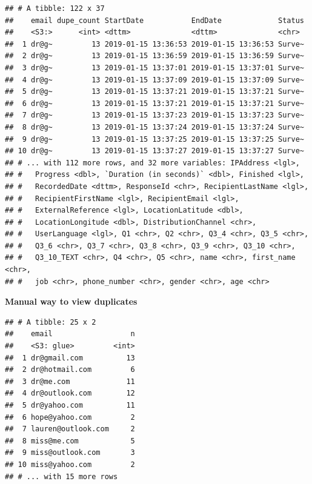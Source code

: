 \documentclass[]{book}
\newenvironment{Shaded}{\begin{snugshade}}{\end{snugshade}}
\newcommand{\CommentTok}[1]{\textcolor[rgb]{0.56,0.35,0.01}{\textit{#1}}}
\newcommand{\DecValTok}[1]{\textcolor[rgb]{0.00,0.00,0.81}{#1}}
\newcommand{\KeywordTok}[1]{\textcolor[rgb]{0.13,0.29,0.53}{\textbf{#1}}}
\newcommand{\NormalTok}[1]{#1}
\newcommand{\OperatorTok}[1]{\textcolor[rgb]{0.81,0.36,0.00}{\textbf{#1}}}
\newcommand{\StringTok}[1]{\textcolor[rgb]{0.31,0.60,0.02}{#1}}
\begin{document}
\begin{verbatim}
## # A tibble: 122 x 37
##    email dupe_count StartDate           EndDate             Status
##    <S3:>      <int> <dttm>              <dttm>              <chr> 
##  1 dr@g~         13 2019-01-15 13:36:53 2019-01-15 13:36:53 Surve~
##  2 dr@g~         13 2019-01-15 13:36:59 2019-01-15 13:36:59 Surve~
##  3 dr@g~         13 2019-01-15 13:37:01 2019-01-15 13:37:01 Surve~
##  4 dr@g~         13 2019-01-15 13:37:09 2019-01-15 13:37:09 Surve~
##  5 dr@g~         13 2019-01-15 13:37:21 2019-01-15 13:37:21 Surve~
##  6 dr@g~         13 2019-01-15 13:37:21 2019-01-15 13:37:21 Surve~
##  7 dr@g~         13 2019-01-15 13:37:23 2019-01-15 13:37:23 Surve~
##  8 dr@g~         13 2019-01-15 13:37:24 2019-01-15 13:37:24 Surve~
##  9 dr@g~         13 2019-01-15 13:37:25 2019-01-15 13:37:25 Surve~
## 10 dr@g~         13 2019-01-15 13:37:27 2019-01-15 13:37:27 Surve~
## # ... with 112 more rows, and 32 more variables: IPAddress <lgl>,
## #   Progress <dbl>, `Duration (in seconds)` <dbl>, Finished <lgl>,
## #   RecordedDate <dttm>, ResponseId <chr>, RecipientLastName <lgl>,
## #   RecipientFirstName <lgl>, RecipientEmail <lgl>,
## #   ExternalReference <lgl>, LocationLatitude <dbl>,
## #   LocationLongitude <dbl>, DistributionChannel <chr>,
## #   UserLanguage <lgl>, Q1 <chr>, Q2 <chr>, Q3_4 <chr>, Q3_5 <chr>,
## #   Q3_6 <chr>, Q3_7 <chr>, Q3_8 <chr>, Q3_9 <chr>, Q3_10 <chr>,
## #   Q3_10_TEXT <chr>, Q4 <chr>, Q5 <chr>, name <chr>, first_name <chr>,
## #   job <chr>, phone_number <chr>, gender <chr>, age <chr>
\end{verbatim}

\textbf{Manual way to view duplicates}

\begin{Shaded}
\end{Shaded}

\begin{verbatim}
## # A tibble: 25 x 2
##    email                  n
##    <S3: glue>         <int>
##  1 dr@gmail.com          13
##  2 dr@hotmail.com         6
##  3 dr@me.com             11
##  4 dr@outlook.com        12
##  5 dr@yahoo.com          11
##  6 hope@yahoo.com         2
##  7 lauren@outlook.com     2
##  8 miss@me.com            5
##  9 miss@outlook.com       3
## 10 miss@yahoo.com         2
## # ... with 15 more rows
\end{verbatim}
\end{document}

